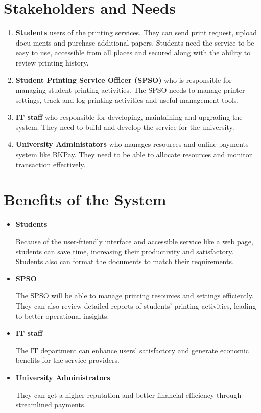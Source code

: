 \section{Stakeholders and Needs}
\vspace{-0.2em}
\begin{enumerate}[label=\textbf{\arabic*}.]
    \item \textbf{Students}
    users of the printing services. They can send print request, upload docu ments and purchase additional papers.  Students need the service to be easy to use, accessible from all places and secured along with the ability to review printing history.  
    \item \textbf{Student Printing Service Officer (SPSO)}
    who is responsible for managing student printing activities. The SPSO needs to manage printer settings, track and log printing activities and useful management tools.
    \item \textbf{IT staff}
    who responsible for developing, maintaining and upgrading the system. They need to build and develop the service for the university. 
    \item \textbf{University Administators}
    who manages resources and online payments system like BKPay. They need to be able to allocate resources and monitor transaction effectively. 
\end{enumerate}

\section{Benefits of the System}

\begin{itemize}
    \item \textbf{Students}
    
    Because of the user-friendly interface and accessible service like a web page, students can save time, increasing their productivity and satisfactory. Students also can format the documents to match their requirements. 
    \item \textbf{SPSO}
    
    The SPSO will be able to manage printing resources and settings efficiently. They can also review detailed reports of students’ printing activities, leading to better operational insights.
    \item \textbf{IT staff}
    
    The IT department can enhance users’ satisfactory and generate economic benefits for the service providers.
    \item \textbf{University Administrators}
    
    They can get a higher reputation and better financial efficiency through streamlined payments. 
\end{itemize}

